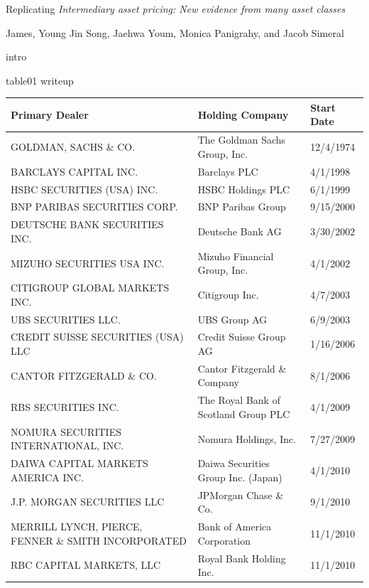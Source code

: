 \documentclass{article}
\begin{document}
{
\fontsize{12}{14}\selectfont
\textnormal{Replicating} \textit{Intermediary asset pricing: New evidence from many asset classes}
}

\bigskip

{
\fontsize{10}{12}\selectfont
James, Young Jin Song, Jaehwa Youm, Monica Panigrahy, and Jacob Simeral
}
\par
intro\par

\par
table01 writeup\par

\begin{adjustbox}{max width=\textwidth}
\begin{tabular}{lll}
\toprule
Primary Dealer & Holding Company & Start Date \\
\midrule
GOLDMAN, SACHS \& CO.                & The Goldman Sachs Group, Inc. & 12/4/1974 \\
BARCLAYS CAPITAL INC.               & Barclays PLC & 4/1/1998 \\
HSBC SECURITIES (USA) INC.          & HSBC Holdings PLC & 6/1/1999 \\
BNP PARIBAS SECURITIES CORP.     & BNP Paribas Group & 9/15/2000 \\
DEUTSCHE BANK SECURITIES INC.    & Deutsche Bank AG & 3/30/2002 \\
MIZUHO SECURITIES USA INC.       & Mizuho Financial Group, Inc. & 4/1/2002 \\
CITIGROUP GLOBAL MARKETS INC.    & Citigroup Inc. & 4/7/2003 \\
UBS SECURITIES LLC.                 & UBS Group AG & 6/9/2003 \\
CREDIT SUISSE SECURITIES (USA) LLC     & Credit Suisse Group AG & 1/16/2006 \\
CANTOR FITZGERALD \& CO. & Cantor Fitzgerald \& Company & 8/1/2006 \\
RBS SECURITIES INC. & The Royal Bank of Scotland Group PLC & 4/1/2009 \\
NOMURA SECURITIES INTERNATIONAL, INC. & Nomura Holdings, Inc. & 7/27/2009 \\
DAIWA CAPITAL MARKETS AMERICA INC.   & Daiwa Securities Group Inc. (Japan) & 4/1/2010 \\
J.P. MORGAN SECURITIES LLC         & JPMorgan Chase \& Co. & 9/1/2010 \\
MERRILL LYNCH, PIERCE, FENNER \& SMITH INCORPORATED & Bank of America Corporation & 11/1/2010 \\
RBC CAPITAL MARKETS, LLC & Royal Bank Holding Inc. & 11/1/2010 \\

\end{tabular}
\end{adjustbox}
\end{document}
